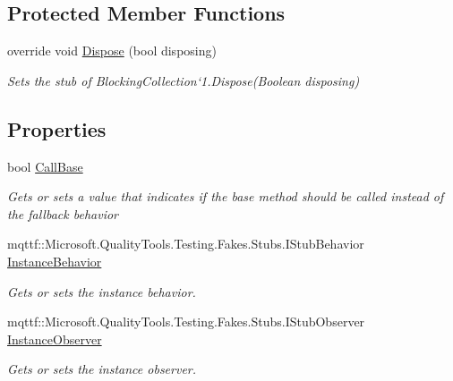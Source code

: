 \subsection*{Protected Member Functions}
\begin{DoxyCompactItemize}
\item 
override void \hyperlink{class_system_1_1_collections_1_1_concurrent_1_1_fakes_1_1_stub_blocking_collection_3_01_t_01_4_a6a7025413cb7b8fa441f8488389d9e79}{Dispose} (bool disposing)
\begin{DoxyCompactList}\small\item\em Sets the stub of Blocking\-Collection`1.Dispose(\-Boolean disposing)\end{DoxyCompactList}\end{DoxyCompactItemize}
\subsection*{Properties}
\begin{DoxyCompactItemize}
\item 
bool \hyperlink{class_system_1_1_collections_1_1_concurrent_1_1_fakes_1_1_stub_blocking_collection_3_01_t_01_4_a18245f1c31fe69dc6f64dbb2a6c1fe1a}{Call\-Base}
\begin{DoxyCompactList}\small\item\em Gets or sets a value that indicates if the base method should be called instead of the fallback behavior\end{DoxyCompactList}\item 
mqttf\-::\-Microsoft.\-Quality\-Tools.\-Testing.\-Fakes.\-Stubs.\-I\-Stub\-Behavior \hyperlink{class_system_1_1_collections_1_1_concurrent_1_1_fakes_1_1_stub_blocking_collection_3_01_t_01_4_a8b93949ee7ea6dae722ad1a933fc39df}{Instance\-Behavior}
\begin{DoxyCompactList}\small\item\em Gets or sets the instance behavior.\end{DoxyCompactList}\item 
mqttf\-::\-Microsoft.\-Quality\-Tools.\-Testing.\-Fakes.\-Stubs.\-I\-Stub\-Observer \hyperlink{class_system_1_1_collections_1_1_concurrent_1_1_fakes_1_1_stub_blocking_collection_3_01_t_01_4_aa5f131d2dbd7330d2b1b549d81ec30e4}{Instance\-Observer}
\begin{DoxyCompactList}\small\item\em Gets or sets the instance observer.\end{DoxyCompactList}\end{DoxyCompactItemize}


